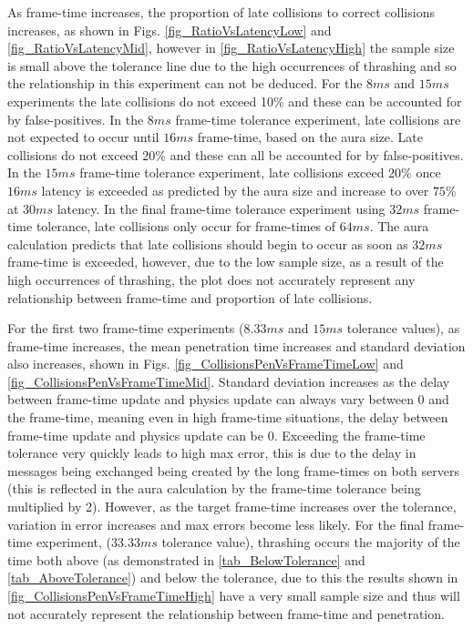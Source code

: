 As frame-time increases, the proportion of late collisions to correct collisions increases, as shown in Figs. \ref{fig_RatioVsLatencyLow} and \ref{fig_RatioVsLatencyMid}, however in \ref{fig_RatioVsLatencyHigh} the sample size is small above the tolerance line due to the high occurrences of thrashing and so the relationship in this experiment can not be deduced. For the $8ms$ and $15ms$ experiments the late collisions do not exceed 10\% and these can be accounted for by false-positives. In the $8ms$ frame-time tolerance experiment, late collisions are not expected to occur until $16ms$ frame-time, based on the aura size. Late collisions do not exceed $20\%$ and these can all be accounted for by false-positives. In the $15ms$ frame-time tolerance experiment, late collisions exceed $20\%$ once $16ms$ latency is exceeded as predicted by the aura size and increase to over $75\%$ at $30ms$ latency.
In the final frame-time tolerance experiment using $32ms$ frame-time tolerance, late collisions only occur for frame-times of $64ms$. The aura calculation predicts that late collisions should begin to occur as soon as $32ms$ frame-time is exceeded, however, due to the low sample size, as a result of the high occurrences of thrashing, the plot does not accurately represent any relationship between frame-time and proportion of late collisions.

For the first two frame-time experiments ($8.33ms$ and $15ms$ tolerance values), as frame-time increases, the mean penetration time increases and standard deviation also increases, shown in Figs. \ref{fig_CollisionsPenVsFrameTimeLow} and \ref{fig_CollisionsPenVsFrameTimeMid}. Standard deviation increases as the delay between frame-time update and physics update can always vary between 0 and the frame-time, meaning even in high frame-time situations, the delay between frame-time update and physics update can be 0. Exceeding the frame-time tolerance very quickly leads to high max error, this is due to the delay in messages being exchanged being created by the long frame-times on both servers (this is reflected in the aura calculation by the frame-time tolerance being multiplied by 2). However, as the target frame-time increases over the tolerance, variation in error increases and max errors become less likely. For the final frame-time experiment, ($33.33ms$ tolerance value), thrashing occurs the majority of the time both above (as demonstrated in \ref{tab_BelowTolerance} and \ref{tab_AboveTolerance}) and below the tolerance, due to this the results shown in \ref{fig_CollisionsPenVsFrameTimeHigh} have a very small sample size and thus will not accurately represent the relationship between frame-time and penetration.

